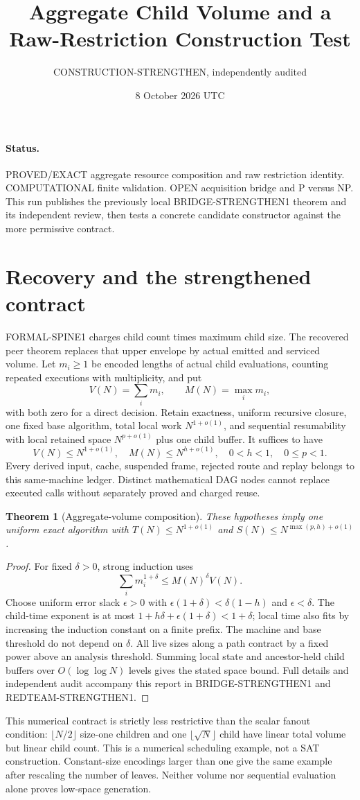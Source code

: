 \documentclass[11pt]{article}
\title{Aggregate Child Volume and a Raw-Restriction Construction Test}
\author{CONSTRUCTION-STRENGTHEN, independently audited}
\date{8 October 2026 UTC}
\newtheorem{theorem}{Theorem}
\begin{document}
\sloppy\maketitle
\paragraph{Status.} PROVED/EXACT aggregate resource composition and raw
restriction identity. COMPUTATIONAL finite validation. OPEN acquisition
bridge and P versus NP. This run publishes the previously local
BRIDGE-STRENGTHEN1 theorem and its independent review, then tests a concrete
candidate constructor against the more permissive contract.

\section{Recovery and the strengthened contract}
FORMAL-SPINE1 charges child count times maximum child size. The recovered
peer theorem replaces that upper envelope by actual emitted and serviced
volume. Let $m_i\ge1$ be encoded lengths of actual child evaluations,
counting repeated executions with multiplicity, and put
\[
 V(N)=\sum_i m_i,\qquad M(N)=\max_i m_i,
\]
with both zero for a direct decision. Retain exactness, uniform recursive
closure, one fixed base algorithm, total local work $N^{1+o(1)}$, and
sequential resumability with local retained space $N^{p+o(1)}$ plus one
child buffer. It suffices to have
\[
 V(N)\le N^{1+o(1)},\quad M(N)\le N^{h+o(1)},\quad 0<h<1,
 \quad 0\le p<1.
\]
Every derived input, cache, suspended frame, rejected route and replay
belongs to this same-machine ledger. Distinct mathematical DAG nodes
cannot replace executed calls without separately proved and charged reuse.

\begin{theorem}[Aggregate-volume composition]
These hypotheses imply one uniform exact algorithm with
$T(N)\le N^{1+o(1)}$ and $S(N)\le N^{\max(p,h)+o(1)}$.
\end{theorem}
\begin{proof}
For fixed $\delta>0$, strong induction uses
\[
 \sum_i m_i^{1+\delta}\le M(N)^\delta V(N).
\]
Choose uniform error slack $\epsilon>0$ with
$\epsilon(1+\delta)<\delta(1-h)$ and $\epsilon<\delta$.
The child-time exponent is at most
$1+h\delta+\epsilon(1+\delta)<1+\delta$; local time also fits by
increasing the induction constant on a finite prefix. The machine and
base threshold do not depend on $\delta$. All live sizes along a path
contract by a fixed power above an analysis threshold. Summing local
state and ancestor-held child buffers over $O(\log\log N)$ levels gives
the stated space bound. Full details and independent audit accompany
this report in BRIDGE-STRENGTHEN1 and REDTEAM-STRENGTHEN1.
\end{proof}
This numerical contract is strictly less restrictive than the scalar
fanout condition: $\lfloor N/2\rfloor$ size-one children and one
$\lfloor\sqrt N\rfloor$ child have linear total volume but linear child
count. This is a numerical scheduling example, not a SAT construction.
Constant-size encodings larger than one give the same example after
rescaling the number of leaves. Neither volume nor sequential evaluation
alone proves low-space generation.
\end{document}

